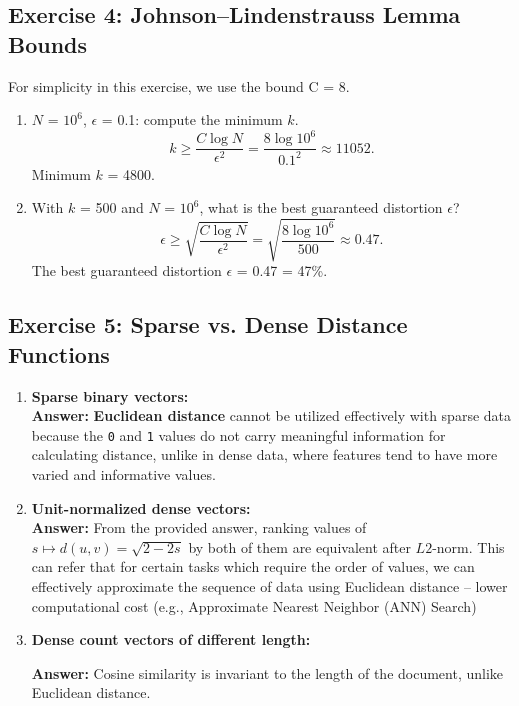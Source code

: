 \documentclass[11pt]{article}
\begin{document}
\subsection*{Exercise 4: Johnson–Lindenstrauss Lemma Bounds}

\noindent
For simplicity in this exercise, we use the bound C = 8.

\begin{enumerate}[label=(\alph*)]
    \item {
        \(N\) = \(10^6\), \(\epsilon\) = 0.1: compute the minimum \(k\).
        \[
            k \geq \frac{C \log N}{\epsilon^2} = \frac{8 \log 10^6}{0.1^2} \approx 11052.
        \]
        Minimum \(k\) = 4800.
        }
    \item {
        With \(k\) = 500 and \(N\) = \(10^6\), what is the best guaranteed distortion \(\epsilon\)?
        \[
            \epsilon \geq \sqrt{\frac{C \log N}{\epsilon^2}} = \sqrt{\frac{8 \log 10^6}{500}} \approx 0.47.
        \]
        The best guaranteed distortion \(\epsilon\) = 0.47 = 47\%.
        }
\end{enumerate}

\subsection*{Exercise 5: Sparse vs. Dense Distance Functions}

\begin{enumerate}[label=(\alph*)]
    \item {
        \textbf{Sparse binary vectors: } \\ 
        
        \textbf{Answer:} \textbf{Euclidean distance} cannot be utilized effectively with sparse data because the \texttt{0} and \texttt{1} values do not carry meaningful information for calculating distance, unlike in dense data, where features tend to have more varied and informative values.
        }
    \item {
        \textbf{Unit-normalized dense vectors:} \\
        
        \textbf{Answer:} From the provided answer, ranking values of \(s \mapsto d(u,v) = \sqrt{2-2s}\) by both of them are equivalent after \(L2\)-norm.
        This can refer that for certain tasks which require the order of values, we can effectively approximate the sequence of data using Euclidean distance -- lower computational cost (e.g., Approximate Nearest Neighbor (ANN) Search)
        }
    \item {
        \textbf{Dense count vectors of different length: }
        
        \textbf{Answer:} Cosine similarity is invariant to the length of the document, unlike Euclidean distance.
        }
\end{enumerate}
\end{document}
